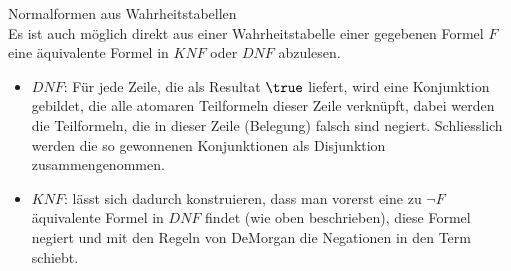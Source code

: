 \begin{howto}{Normalformen aus Wahrheitstabellen}\\
    Es ist auch möglich direkt aus einer Wahrheitstabelle einer gegebenen Formel $F$ eine äquivalente Formel in $KNF$ oder $DNF$ abzulesen.
    \begin{itemize}
        \item $DNF$:  Für jede Zeile, die als Resultat $\true$ liefert, wird eine Konjunktion gebildet, die alle atomaren Teilformeln dieser Zeile verknüpft, dabei werden die Teilformeln, die in dieser Zeile (Belegung) falsch sind negiert. Schliesslich werden die so gewonnenen Konjunktionen als Disjunktion zusammengenommen.
        \item $KNF$: lässt sich dadurch konstruieren, dass man vorerst eine zu $\neg F$ äquivalente Formel in $DNF$ findet (wie oben beschrieben), diese Formel negiert und mit den Regeln von DeMorgan die Negationen in den Term schiebt.
    \end{itemize}
\end{howto}

